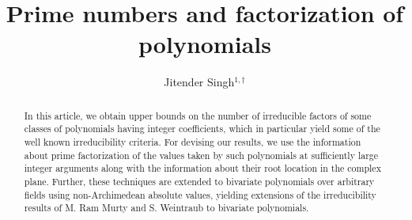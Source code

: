 \documentclass[12pt,reqno]{amsart}%
\begin{document}
\newtheorem{theorem}{Theorem}
\newtheorem{corollary}[theorem]{Corollary}
\newtheorem{lemma}[theorem]{Lemma}
\theoremstyle{definition}
\newtheorem{example}{Example}
\newtheorem*{examples}{Examples}
\newtheorem*{notation}{Notation}
\theoremstyle{theorem}
\newtheorem{thmx}{Theorem}
\renewcommand{\thethmx}{\text{\Alph{thmx}}}%
\newtheorem{lemmax}{Lemma}
\renewcommand{\thelemmax}{\text{\Alph{lemmax}}}%
\hoffset=-0cm
\theoremstyle{definition}
\newtheorem*{definition}{Definition}
\newtheorem*{remark}{\bf Remark}
\title{\bf Prime numbers and factorization of polynomials}
\author{Jitender Singh$^{1,\dagger}$ {\large {}}}
\address[1]{Department of Mathematics,
Guru Nanak Dev University, Amritsar-143005, India\newline %
 {\tt jitender.math@gndu.ac.in}}
\markright{}
\date{}
\maketitle
\newcommand{\K}{\mathbb{K}}
\begin{abstract}
In this article, we obtain upper bounds on the number of irreducible factors of some classes of  polynomials having integer coefficients, which in particular yield some of the well known irreducibility criteria.  For devising our results, we use the information about prime factorization of the values taken by such polynomials at sufficiently large integer arguments along with the information about their root location in the complex plane. Further, these techniques are extended to bivariate polynomials over arbitrary fields using non-Archimedean absolute values, yielding extensions of the irreducibility results of M. Ram Murty and S. Weintraub to bivariate polynomials.
\end{abstract}
\end{document}

